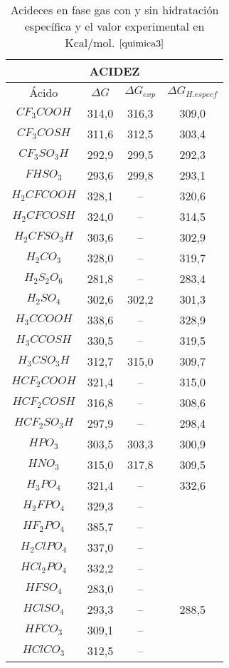  \begin{table}[H]
     \centering
     \begin{tabular}{|c|c|c|c|}
     \hline
     \multicolumn{4}{|c|}{\bfseries{ACIDEZ}} \\ \hline
     Ácido & $\Delta G$ & $\Delta G_{exp}$ & $\Delta G_{ H. especf}$ \\ \hline
$CF_3COOH$ & 314,0 & 316,3 & 309,0\\ \hline
$CF_3COSH$ & 311,6 & 312,5 & 303,4\\ \hline
$CF_3SO_3H$ & 292,9 & 299,5 &292,3\\ \hline
$FHSO_3$ & 293,6 & 299,8 & 293,1\\ \hline
$H_2CFCOOH$ & 328,1 &-- & 320,6\\ \hline
$H_2CFCOSH$ & 324,0 & --& 314,5\\ \hline
$H_2CFSO_3H$ & 303,6 & -- & 302,9\\ \hline
$H_2CO_3$ & 328,0	& -- & 319,7\\ \hline
$H_2S_2O_6$ & 281,8 & -- & 283,4\\ \hline
$H_2SO_4$ & 302,6	& 302,2 & 301,3\\ \hline
$H_3CCOOH$ & 338,6 & -- &	328,9\\ \hline
$H_3CCOSH$ & 330,5 & -- &	319,5\\ \hline
$H_3CSO_3H$ & 312,7 & 315,0 & 309,7\\ \hline
$HCF_2COOH$ & 	321,4 & -- & 315,0\\ \hline
$HCF_2COSH$ & 	316,8 & -- & 308,6\\ \hline
$HCF_2SO_3H$ & 	297,9 & -- & 298,4\\ \hline
$HPO_3$ & 303,5 & 303,3 & 300,9\\ \hline
$HNO_3$ & 315,0 & 317,8 & 309,5\\ \hline
$H_3PO_4$ & 321,4	& -- & 332,6 \\ \hline
$H_2FPO_4$ & 329,3 & -- &\\ \hline
$HF_2PO_4$ & 385,7 & -- &  \\ \hline
$H_2ClPO_4$ & 337,0 & -- &\\ \hline
$HCl_2PO_4$ & 332,2 & -- &\\ \hline
$HFSO_4$ & 283,0 & -- &\\ \hline
$HClSO_4$ & 293,3 & -- & 288,5\\ \hline
$HFCO_3$ & 309,1 & -- &\\ \hline
$HClCO_3$ & 312,5 & -- &\\ \hline


     \end{tabular}
     \caption{Acideces en fase gas con y sin hidratación específica y el valor experimental en Kcal/mol. $\cite{quimica3}$ }
     \label{tab:3.7}
 \end{table}

